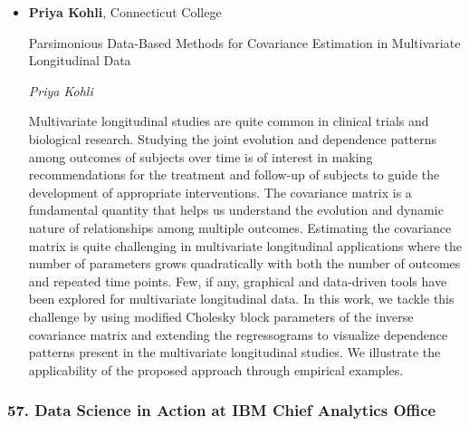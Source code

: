 \begin{itemize}
\item \textbf{Priya Kohli}, Connecticut College

Parsimonious Data-Based Methods for Covariance Estimation in Multivariate Longitudinal Data

\emph{\footnotesize Priya Kohli}

Multivariate longitudinal studies are quite common in clinical trials and biological research. Studying the joint evolution and dependence patterns among outcomes of subjects over time is of interest in making recommendations for the treatment and follow-up of subjects to guide the development of appropriate interventions. The covariance matrix is a fundamental quantity that helps us understand the evolution and dynamic nature of relationships among multiple outcomes. Estimating the covariance matrix is quite challenging in multivariate longitudinal applications where the number of parameters grows quadratically with both the number of outcomes and repeated time points. Few, if any, graphical and data-driven tools have been explored for multivariate longitudinal data. In this work, we tackle this challenge by using modified Cholesky block parameters of the inverse covariance matrix and extending the regressograms to visualize dependence patterns present in the multivariate longitudinal studies. We illustrate the applicability of the proposed approach through empirical examples.

\end{itemize}

\subsubsection*{57. Data Science in Action at IBM Chief Analytics Office}

